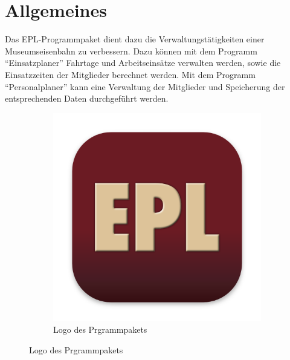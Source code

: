 \chapter{Allgemeines}

Das EPL-Programmpaket dient dazu die Verwaltungstätigkeiten einer Museumseisenbahn zu verbessern.
Dazu können mit dem Programm ``Einsatzplaner'' Fahrtage und Arbeitseinsätze verwalten werden, sowie die Einsatzzeiten der Mitglieder berechnet werden.
Mit dem Programm ``Personalplaner'' kann eine Verwaltung der Mitglieder und Speicherung der entsprechenden Daten durchgeführt werden. 

\begin{figure}[h!]
  \centering
  \begin{subfigure}{0.3\textwidth}
    \includegraphics[width=\textwidth]{../../Icon/EPL.png}
    \caption{Logo des Prgrammpakets}
  \end{subfigure}
    

\end{figure}

